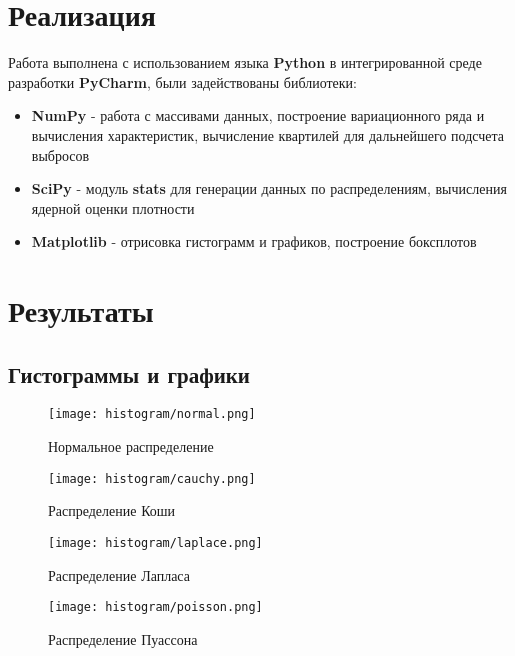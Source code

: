 \documentclass[12pt,a4paper]{article}
\begin{document}
\pagebreak

\section{Реализация}
Работа выполнена с использованием языка \textbf{Python} в интегрированной среде разработки \textbf{PyCharm}, были задействованы библиотеки:

\begin{itemize}
	\item \textbf{NumPy} - работа с массивами данных, построение вариационного ряда и вычисления характеристик, вычисление квартилей для дальнейшего подсчета выбросов
	\item \textbf{SciPy} - модуль \textbf{stats} для генерации данных по распределениям, вычисления ядерной оценки плотности
	\item \textbf{Matplotlib} - отрисовка гистограмм и графиков, построение боксплотов
\end{itemize}
\pagebreak

\section{Результаты}
\subsection{Гистограммы и графики}
\begin{figure}[h!]
	\centering
	\texttt{[image: histogram/normal.png]}
	\caption{Нормальное распределение}
	\label{fig:image}
\end{figure}

\begin{figure}[h!]
	\centering
	\texttt{[image: histogram/cauchy.png]}
	\caption{Распределение Коши}
	\label{fig:image}
\end{figure}

\pagebreak

\begin{figure}[h!]
	\centering
	\texttt{[image: histogram/laplace.png]}
	\caption{Распределение Лапласа}
	\label{fig:image}
\end{figure}

\begin{figure}[h!]
	\centering
	\texttt{[image: histogram/poisson.png]}
	\caption{Распределение Пуассона}
	\label{fig:image}
\end{figure}

\pagebreak
\end{document}
